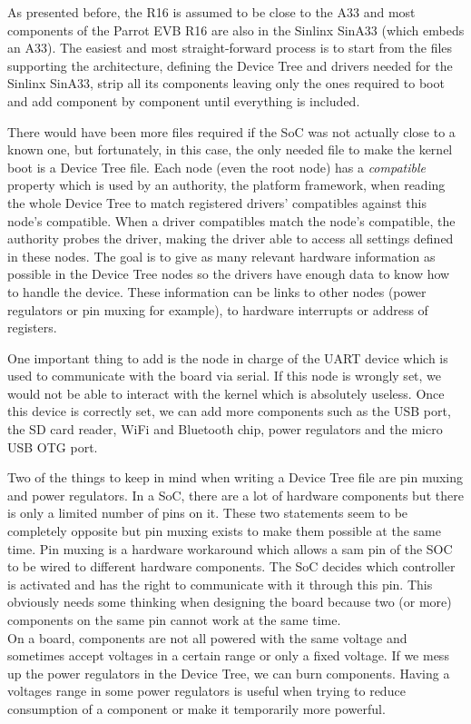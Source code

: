 As presented before, the R16 is assumed to be close to the A33 and most components of the Parrot EVB R16 are also in the Sinlinx SinA33 (which embeds an A33). The easiest and most straight-forward process is to start from the files supporting the architecture, defining the Device Tree and drivers needed for the Sinlinx SinA33, strip all its components leaving only the ones required to boot and add component by component until everything is included.

There would have been more files required if the SoC was not actually close to a known one, but fortunately, in this case, the only needed file to make the kernel boot is a Device Tree file. Each node (even the root node) has a \textit{compatible} property which is used by an authority, the platform framework, when reading the whole Device Tree to match registered drivers' compatibles against this node's compatible. When a driver compatibles match the node's compatible, the authority probes the driver, making the driver able to access all settings defined in these nodes. The goal is to give as many relevant hardware information as possible in the Device Tree nodes so the drivers have enough data to know how to handle the device. These information can be links to other nodes (power regulators or pin muxing for example), to hardware interrupts or address of registers.

One important thing to add is the node in charge of the UART device which is used to communicate with the board via serial. If this node is wrongly set, we would not be able to interact with the kernel which is absolutely useless. Once this device is correctly set, we can add more components such as the USB port, the SD card reader, WiFi and Bluetooth chip, power regulators and the micro USB OTG port.

Two of the things to keep in mind when writing a Device Tree file are pin muxing and power regulators. In a SoC, there are a lot of hardware components but there is only a limited number of pins on it. These two statements seem to be completely opposite but pin muxing exists to make them possible at the same time. Pin muxing is a hardware workaround which allows a sam pin of the SOC to be wired to different hardware components. The SoC decides which controller is activated and has the right to communicate with it through this pin. This obviously needs some thinking when designing the board because two (or more) components on the same pin cannot work at the same time.\\
On a board, components are not all powered with the same voltage and sometimes accept voltages in a certain range or only a fixed voltage. If we mess up the power regulators in the Device Tree, we can burn components. Having a voltages range in some power regulators is useful when trying to reduce consumption of a component or make it temporarily more powerful.

